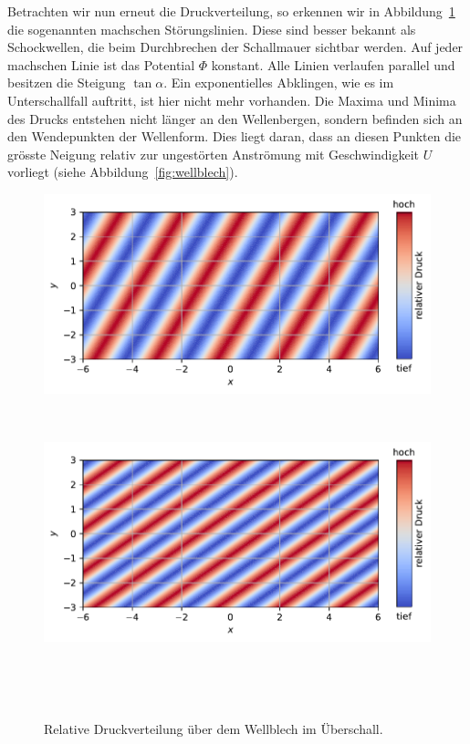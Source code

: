 Betrachten wir nun erneut die Druckverteilung, so erkennen wir in 
Abbildung~\ref{fig:druckvert_ueberschall} die sogenannten machschen Störungslinien. 
Diese sind besser bekannt als Schockwellen, 
die beim Durchbrechen der Schallmauer sichtbar werden. 
Auf jeder machschen Linie ist das Potential \(\Phi\) konstant. 
Alle Linien verlaufen parallel und besitzen die Steigung \(\tan \alpha\).
Ein exponentielles Abklingen, wie es im Unterschallfall auftritt, 
ist hier nicht mehr vorhanden. 
Die Maxima und Minima des Drucks entstehen nicht länger an den Wellenbergen, 
sondern befinden sich an den Wendepunkten der Wellenform. 
Dies liegt daran, dass an diesen Punkten die grösste Neigung relativ zur 
ungestörten Anströmung mit Geschwindigkeit \(U\) vorliegt 
(siehe Abbildung~\ref{fig:wellblech}).
\begin{figure}
    \centering
    \begin{minipage}[b]{\textwidth}
        \centering
        \includegraphics[width=\linewidth]{papers/ueberschall/figures/druck_mach_kegel_400.pdf}
        \caption*{$U = 400\,\frac{\mathrm{m}}{\mathrm{s}}$}
        ~\label{fig:druckvert_ueberschall_u400}
    \end{minipage}
    \hfill
    \begin{minipage}[b]{\textwidth}
        \centering
        \includegraphics[width=\linewidth]{papers/ueberschall/figures/druck_mach_kegel_600.pdf}
        \caption*{$U = 600\,\frac{\mathrm{m}}{\mathrm{s}}$}
        ~\label{fig:druckvert_ueberschall_u600}
    \end{minipage}
    \caption{Relative Druckverteilung über dem Wellblech im Überschall.}
~\label{fig:druckvert_ueberschall}
\end{figure}